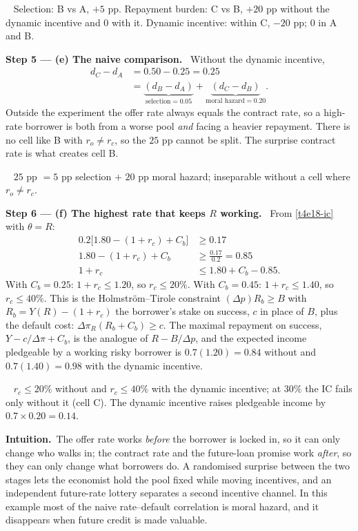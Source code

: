 \documentclass[11pt,a4paper]{article}
\newcommand{\step}[2]{\par\medskip\noindent\textbf{Step #1 --- #2.}~}
\newcommand{\intuition}{\par\medskip\noindent\textbf{Intuition.}~}
\newcommand{\answer}[1]{\par\smallskip\noindent\fbox{\textbf{Answer #1.}}~}
\begin{document}
\answer{(d)} Selection: B vs A, $+5$ pp. Repayment burden: C vs B, $+20$ pp without the dynamic incentive and $0$ with it.
Dynamic incentive: within C, $-20$ pp; $0$ in A and B.

\step{5}{(e) The naive comparison} Without the dynamic incentive,
\begin{align}
  d_C-d_A &= 0.50-0.25 = 0.25 \nonumber\\
          &= \underbrace{(d_B-d_A)}_{\text{selection}=0.05}+\underbrace{(d_C-d_B)}_{\text{moral hazard}=0.20}. \label{t4e18-naive}
\end{align}
Outside the experiment the offer rate always equals the contract rate, so a high-rate borrower is both from a
worse pool \emph{and} facing a heavier repayment. There is no cell like B with $r_o\ne r_c$, so the $25$ pp
cannot be split. The surprise contract rate is what creates cell B.

\answer{(e)} $25$ pp $=5$ pp selection $+$ $20$ pp moral hazard; inseparable without a cell where $r_o\ne r_c$.

\step{6}{(f) The highest rate that keeps $R$ working} From \eqref{t4e18-ic} with $\theta=R$:
\begin{align}
  0.2\big[1.80-(1+r_c)+C_b\big] &\ge 0.17 \nonumber\\
  1.80-(1+r_c)+C_b &\ge \frac{0.17}{0.2} = 0.85 \nonumber\\
  1+r_c &\le 1.80+C_b-0.85. \label{t4e18-max}
\end{align}
With $C_b=0.25$: $1+r_c\le1.20$, so $r_c\le20\%$. With $C_b=0.45$: $1+r_c\le1.40$, so $r_c\le40\%$. This is the
Holmström--Tirole constraint $(\Delta p)R_b\ge B$ with $R_b=Y(R)-(1+r_c)$ the borrower's stake on success, $c$
in place of $B$, plus the default cost: $\Delta\pi_R(R_b+C_b)\ge c$. The maximal repayment on success,
$Y-c/\Delta\pi+C_b$, is the analogue of $R-B/\Delta p$, and the expected income pledgeable by a working risky
borrower is $0.7(1.20)=0.84$ without and $0.7(1.40)=0.98$ with the dynamic incentive.

\answer{(f)} $r_c\le20\%$ without and $r_c\le40\%$ with the dynamic incentive; at $30\%$ the IC fails only without it
(cell C). The dynamic incentive raises pledgeable income by $0.7\times0.20=0.14$.

\intuition The offer rate works \emph{before} the borrower is locked in, so it can only change who walks in;
the contract rate and the future-loan promise work \emph{after}, so they can only change what borrowers do. A
randomised surprise between the two stages lets the economist hold the pool fixed while moving incentives, and
an independent future-rate lottery separates a second incentive channel. In this example most of the naive
rate--default correlation is moral hazard, and it disappears when future credit is made valuable.
\end{document}
